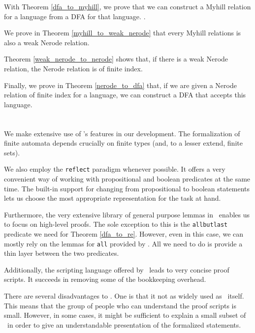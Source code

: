 With Theorem \ref{dfa_to_myhill}, we prove that we can construct a Myhill relation for a language from a DFA for that language.
.

We prove in Theorem \ref{myhill_to_weak_nerode} that every Myhill relations is also a weak Nerode relation.

Theorem \ref{weak_nerode_to_nerode} shows that, if there is a weak Nerode relation, the Nerode relation is of finite index.

Finally, we prove in Theorem \ref{nerode_to_dfa} that, if we are given a Nerode relation of finite index for a language, we can construct a DFA that accepts this language.

\section{\ssreflect}
We make extensive use of \ssreflect's features in our development.
The formalization of finite automata depends crucially on finite types (and, to a lesser extend, finite sets).

We also employ the \lstinline{reflect} paradigm whenever possible.
It offers a very convenient way of working with propositional and boolean predicates at the same time.
The built-in support for changing from propositional to boolean statements lets us choose the most appropriate representation for the task at hand.


Furthermore, the very extensive library of general purpose lemmas in \ssreflect\ enables us to focus on high-level proofs. 
The sole exception to this is the \lstinline{allbutlast} predicate we need for Theorem \ref{dfa_to_re}.
However, even in this case, we can mostly rely on the lemmas for \lstinline{all} provided by \ssreflect.
All we need to do is provide a thin layer between the two predicates.

Additionally, the scripting language offered by \ssreflect\ leads to very concise proof scripts. 
It succeeds in removing some of the bookkeeping overhead. %

There are several disadvantages to \ssreflect. 
One is that it not as widely used as \coq\ itself. 
This means that the group of people who can understand the 
proof scripts is small.
However, in some cases, it might be sufficient to explain a small subset of
\ssreflect\ in order to give an understandable presentation of the formalized statements. 

